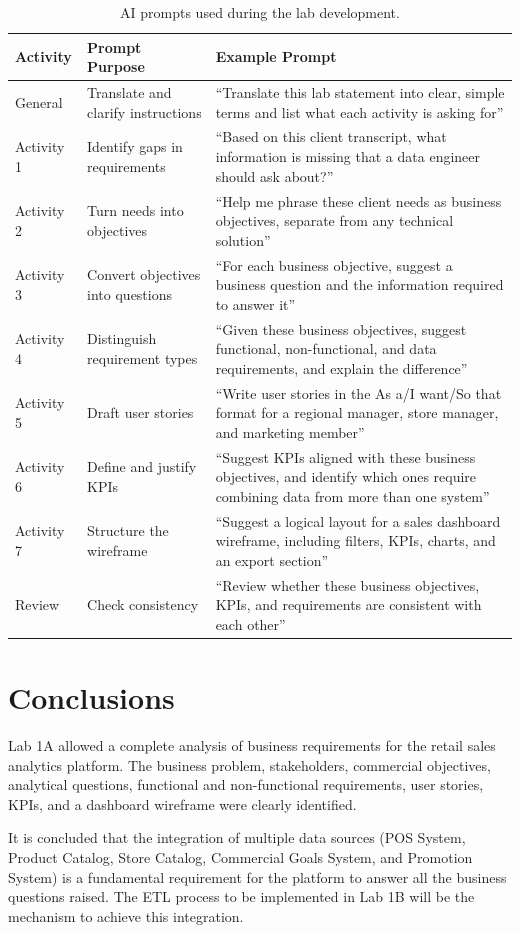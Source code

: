 \documentclass[12pt,a4paper]{article}
\begin{document}
\begin{table}[H]
\centering
\small
\begin{tabular}{p{2cm} p{4cm} p{7cm}}
\toprule
\textbf{Activity} & \textbf{Prompt Purpose} & \textbf{Example Prompt}\\
\midrule
General & Translate and clarify instructions & ``Translate this lab statement into clear, simple terms and list what each activity is asking for''\\
Activity 1 & Identify gaps in requirements & ``Based on this client transcript, what information is missing that a data engineer should ask about?''\\
Activity 2 & Turn needs into objectives & ``Help me phrase these client needs as business objectives, separate from any technical solution''\\
Activity 3 & Convert objectives into questions & ``For each business objective, suggest a business question and the information required to answer it''\\
Activity 4 & Distinguish requirement types & ``Given these business objectives, suggest functional, non-functional, and data requirements, and explain the difference''\\
Activity 5 & Draft user stories & ``Write user stories in the As a/I want/So that format for a regional manager, store manager, and marketing member''\\
Activity 6 & Define and justify KPIs & ``Suggest KPIs aligned with these business objectives, and identify which ones require combining data from more than one system''\\
Activity 7 & Structure the wireframe & ``Suggest a logical layout for a sales dashboard wireframe, including filters, KPIs, charts, and an export section''\\
Review & Check consistency & ``Review whether these business objectives, KPIs, and requirements are consistent with each other''\\
\bottomrule
\end{tabular}
\caption{AI prompts used during the lab development.}
\end{table}

\section{Conclusions}

Lab 1A allowed a complete analysis of business requirements for the retail sales analytics platform. The business problem, stakeholders, commercial objectives, analytical questions, functional and non-functional requirements, user stories, KPIs, and a dashboard wireframe were clearly identified.

It is concluded that the integration of multiple data sources (POS System, Product Catalog, Store Catalog, Commercial Goals System, and Promotion System) is a fundamental requirement for the platform to answer all the business questions raised. The ETL process to be implemented in Lab 1B will be the mechanism to achieve this integration.

\end{document}
